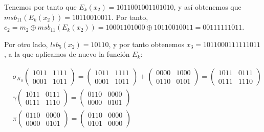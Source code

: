 \documentclass[fleqn]{article}
\begin{document}
    Tenemos por tanto que $E_k(x_2) = 1011001001101010$, y así obtenemos que $msb_{11}(E_k(x_2)) = 10110010011$. Por tanto,
    $c_2 = m_2 \oplus msb_{11}(E_k(x_2)) = 10001101000 \oplus 10110010011 = 00111111011$.

    Por otro lado, $lsb_5(x_2) = 10110$, y por tanto obtenemos $x_3 = 1011000111111011$, a la que aplicamos de nuevo
    la función $E_k$:

    \begin{equation*}
        \begin{aligned}
            &\sigma_{K_0}
            \begin{pmatrix}
                1011 & 1111 \\
                0001 & 1011
            \end{pmatrix} = 
            \begin{pmatrix}
                1011 & 1111 \\
                0001 & 1011
            \end{pmatrix} + 
            \begin{pmatrix}
                0000 & 1000 \\
                0110 & 0101
            \end{pmatrix} = 
            \begin{pmatrix}
                1011 & 0111 \\
                0111 & 1110
            \end{pmatrix} \\
            &\gamma \begin{pmatrix}
                1011 & 0111 \\
                0111 & 1110
            \end{pmatrix} =
            \begin{pmatrix}
                0110 & 0000 \\
                0000 & 0101
            \end{pmatrix} \\
            &\pi \begin{pmatrix}
                0110 & 0000 \\
                0000 & 0101
            \end{pmatrix} =
            \begin{pmatrix}
                0110 & 0000 \\
                0101 & 0000
            \end{pmatrix} \\

\end{aligned}
\end{equation*}
\end{document}
